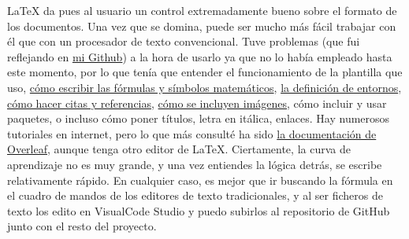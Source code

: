 LaTeX da pues al usuario un control extremadamente bueno sobre el formato de los documentos. Una vez que se 
domina, puede ser mucho más fácil trabajar con él que con un procesador de texto convencional. Tuve 
problemas (que fui reflejando en \href{https://github.com/ElenaMerelo/TFG/issues}{mi Github}) a la hora 
de usarlo ya que no lo había empleado hasta este momento, por lo que tenía que entender 
el funcionamiento de la plantilla que uso, \href{https://github.com/ElenaMerelo/TFG/issues/58}{cómo escribir las fórmulas 
y símbolos matemáticos}, \href{https://github.com/ElenaMerelo/TFG/issues/54}{la definición de entornos}, 
\href{https://github.com/ElenaMerelo/TFG/issues/56}{cómo hacer citas y referencias}, 
\href{https://github.com/ElenaMerelo/TFG/issues/57}{cómo se incluyen imágenes}, cómo incluir y usar paquetes, 
o incluso cómo poner títulos, letra 
en itálica, enlaces. Hay numerosos tutoriales en internet, pero lo que más consulté ha sido
 \href{https://es.overleaf.com/learn}{la documentación de Overleaf}, aunque tenga otro editor de LaTeX. Ciertamente, 
 la curva de aprendizaje no es muy grande, y una vez entiendes la lógica detrás, se escribe relativamente rápido. En 
 cualquier caso, es mejor que ir buscando la fórmula en el cuadro de mandos de los editores de texto tradicionales, 
 y al ser ficheros de texto los edito en VisualCode Studio y puedo subirlos al repositorio de GitHub junto con el resto 
 del proyecto. 

